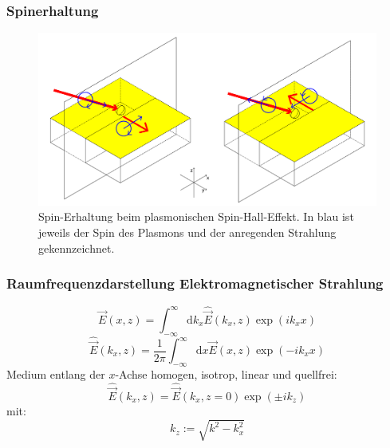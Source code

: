 \documentclass[aspectratio=1610]{beamer}
\begin{document}
		\begin{frame}
			\frametitle{Spinerhaltung}
			\begin{figure}[h]
				\centering
				\includegraphics[width=1.0\linewidth]{figures/spin_hall_schema.pdf}
				\caption[Spin-Erhaltung PSHE]{Spin-Erhaltung beim plasmonischen Spin-Hall-Effekt. In blau ist jeweils der Spin des Plasmons und der anregenden Strahlung gekennzeichnet.}
			\end{figure}
		\end{frame}
	
		\begin{frame}
			\frametitle{Raumfrequenzdarstellung Elektromagnetischer Strahlung}
			\begin{equation}
				\vec{E}(x,z) = 	\int_{-\infty}^{\infty}\mathrm{d}{k_x}\hat{\vec{E}}(k_x,z)\exp(ik_xx)			
			\end{equation}
			\begin{equation}
				\hat{\vec{E}}(k_x,z) = 	\dfrac{1}{2\pi}\int_{-\infty}^{\infty}\mathrm{d}x\vec{E}(x,z)\exp(-ik_xx)
			\end{equation}
				Medium entlang der $x$-Achse homogen, isotrop, linear und quellfrei:
		 	\begin{equation}
			 	\hat{\vec{E}}(k_x,z) =\hat{\vec{E}}(k_x,z= 0) \exp(\pm ik_ z)
			 \end{equation}
		 		mit:
		 	\begin{equation}
		 		k_z := \sqrt{k^2-k_x^2}
		 	\end{equation}		
		\end{frame}
	
\end{document}
